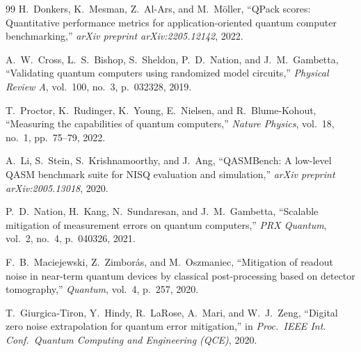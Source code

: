 \documentclass[final,5p,times,number]{elsarticle}
\begin{document}
\begin{thebibliography}{99}
  H.~Donkers, K.~Mesman, Z.~Al-Ars, and M.~M\"{o}ller, ``QPack scores: Quantitative performance metrics for application-oriented quantum computer benchmarking,'' \emph{arXiv preprint arXiv:2205.12142}, 2022.

  A.~W.~Cross, L.~S.~Bishop, S.~Sheldon, P.~D.~Nation, and J.~M.~Gambetta, ``Validating quantum computers using randomized model circuits,'' \emph{Physical Review A}, vol.~100, no.~3, p.~032328, 2019.

  T.~Proctor, K.~Rudinger, K.~Young, E.~Nielsen, and R.~Blume-Kohout, ``Measuring the capabilities of quantum computers,'' \emph{Nature Physics}, vol.~18, no.~1, pp.~75--79, 2022.

  A.~Li, S.~Stein, S.~Krishnamoorthy, and J.~Ang, ``QASMBench: A low-level QASM benchmark suite for NISQ evaluation and simulation,'' \emph{arXiv preprint arXiv:2005.13018}, 2020.

  P.~D.~Nation, H.~Kang, N.~Sundaresan, and J.~M.~Gambetta, ``Scalable mitigation of measurement errors on quantum computers,'' \emph{PRX Quantum}, vol.~2, no.~4, p.~040326, 2021.

  F.~B.~Maciejewski, Z.~Zimbor\'{a}s, and M.~Oszmaniec, ``Mitigation of readout noise in near-term quantum devices by classical post-processing based on detector tomography,'' \emph{Quantum}, vol.~4, p.~257, 2020.

  T.~Giurgica-Tiron, Y.~Hindy, R.~LaRose, A.~Mari, and W.~J.~Zeng, ``Digital zero noise extrapolation for quantum error mitigation,'' in \emph{Proc.\ IEEE Int. Conf.\ Quantum Computing and Engineering (QCE)}, 2020.

\end{thebibliography}
\end{document}

